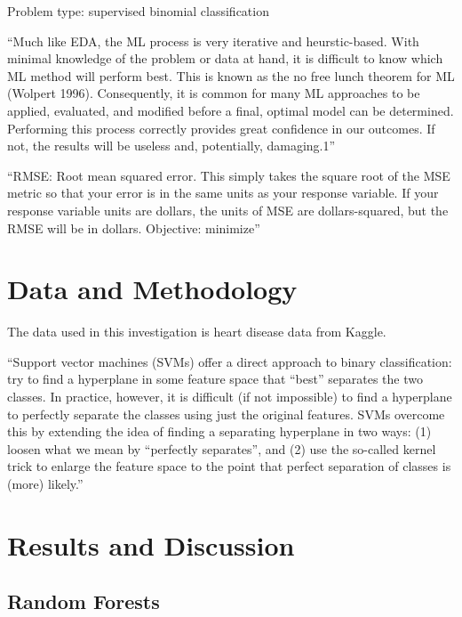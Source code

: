 \documentclass[11pt,preprint, authoryear]{elsarticle}
\numberwithin{equation}{section}
\numberwithin{figure}{section}
\numberwithin{table}{section}
\begin{document}
Problem type: supervised binomial classification

``Much like EDA, the ML process is very iterative and heurstic-based.
With minimal knowledge of the problem or data at hand, it is difficult
to know which ML method will perform best. This is known as the no free
lunch theorem for ML (Wolpert 1996). Consequently, it is common for many
ML approaches to be applied, evaluated, and modified before a final,
optimal model can be determined. Performing this process correctly
provides great confidence in our outcomes. If not, the results will be
useless and, potentially, damaging.1''

``RMSE: Root mean squared error. This simply takes the square root of
the MSE metric so that your error is in the same units as your response
variable. If your response variable units are dollars, the units of MSE
are dollars-squared, but the RMSE will be in dollars. Objective:
minimize''

\hypertarget{data-and-methodology}{%
\section{Data and Methodology}\label{data-and-methodology}}

The data used in this investigation is heart disease data from Kaggle.

``Support vector machines (SVMs) offer a direct approach to binary
classification: try to find a hyperplane in some feature space that
``best'' separates the two classes. In practice, however, it is
difficult (if not impossible) to find a hyperplane to perfectly separate
the classes using just the original features. SVMs overcome this by
extending the idea of finding a separating hyperplane in two ways: (1)
loosen what we mean by ``perfectly separates'', and (2) use the
so-called kernel trick to enlarge the feature space to the point that
perfect separation of classes is (more) likely.''

\hypertarget{results-and-discussion}{%
\section{Results and Discussion}\label{results-and-discussion}}

\hypertarget{random-forests}{%
\subsection{Random Forests}\label{random-forests}}
\end{document}
